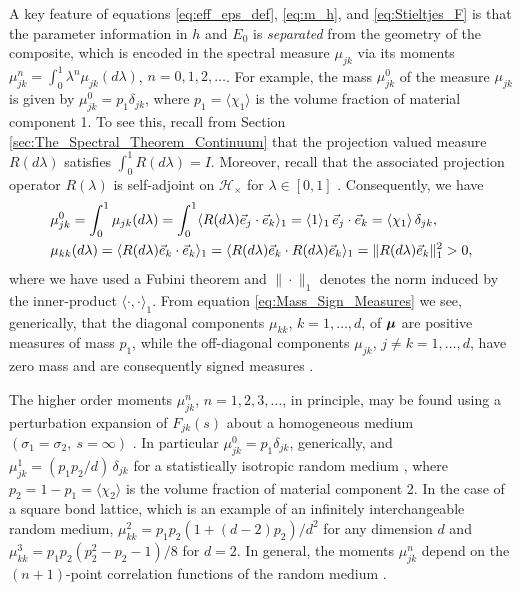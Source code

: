 \documentclass{cmslatex}
\newcommand\bmu{\mbox{\boldmath${\mu}$}}
\begin{document}
A key feature of equations \eqref{eq:eff_eps_def}, \eqref{eq:m_h}, and
\eqref{eq:Stieltjes_F} is that the parameter information in $h$ and
$E_0$ is \emph{separated} from the geometry of the composite, which is
encoded in the spectral measure $\mu_{jk}$ via its moments 
$\mu_{jk}^n=\int_0^1\lambda^n\mu_{jk}(d\lambda)$, $n=0,1,2,\ldots$. For example, the mass
$\mu_{jk}^0$ of the measure $\mu_{jk}$ is given by $\mu_{jk}^0=p_1\delta_{jk}$,
where $p_1=\langle\chi_1\rangle$ is the volume fraction of material component 1.  To
see this, recall from Section \ref{sec:The_Spectral_Theorem_Continuum}
that the projection valued measure $R(d\lambda)$ satisfies
$\int_0^1R(d\lambda)=I$. Moreover, recall that the associated projection
operator $R(\lambda)$ is self-adjoint on $\mathscr{H}_\times$ for $\lambda\in[0,1]$
\cite{Reed-1980,Stone:64}. Consequently, we have
% 
\begin{align}\label{eq:Mass_Sign_Measures}
   &\mu_{jk}^0=\int_0^1\mu_{jk}(d\lambda)=\int_0^1\langle R(d\lambda)\vec{e}_j\cdot\vec{e}_k\rangle_1
        =\langle1\rangle_1\,\vec{e}_j\cdot\vec{e}_k
        =\langle\chi_1\rangle\,\delta_{jk},\\
   &\mu_{kk}(d\lambda)=\langle R(d\lambda)\vec{e}_k\cdot\vec{e}_k\rangle_1
       =\langle R(d\lambda)\vec{e}_k\cdot R(d\lambda)\vec{e}_k\rangle_1
       =\|R(d\lambda)\vec{e}_k\|_1^2>0,\notag
\end{align}
%
where we have used a Fubini theorem \cite{Folland:99}
and $\|\cdot\|_1$ denotes the norm induced by the inner-product
$\langle\cdot,\cdot\rangle_1$. From equation \eqref{eq:Mass_Sign_Measures} we see,
generically, that the diagonal components $\mu_{kk}$, $k=1,\ldots,d$, of
$\bmu$ are positive measures of mass $p_1$, while the off-diagonal
components $\mu_{jk}$, $j\neq k=1,\ldots,d$, have zero mass and are consequently
signed measures \cite{Folland:99,Rudin:87}.



The higher order moments $\mu_{jk}^n$, $n=1,2,3,\ldots$, in principle, may be
found using a perturbation expansion of $F_{jk}(s)$ about a
homogeneous medium $(\sigma_1=\sigma_2, \ s=\infty)$ \cite{Golden:CMP-473}. In
particular $\mu_{jk}^0=p_1\delta_{jk}$, generically, and $\mu_{jk}^1=(p_1p_2/d)\,\delta_{jk}$
for a statistically isotropic random medium 
\cite{Golden:CMP-473,Golden:IMA-97,Bruno:JSP-365}, where
$p_2=1-p_1=\langle\chi_2\rangle$ is the volume fraction of material component 2. In
the case of a square bond lattice, which is an example of an
infinitely interchangeable random medium,
$\mu_{kk}^2=p_1p_2(1+(d-2)p_2)/d^2$ for any dimension $d$ and
$\mu_{kk}^3=p_1p_2(p_2^2-p_2-1)/8$ for $d=2$. In general, the moments
$\mu_{jk}^n$ depend on the $(n+1)$-point correlation functions of the
random medium \cite{Golden:CMP-473,Bruno:JSP-365}.
\end{document}
